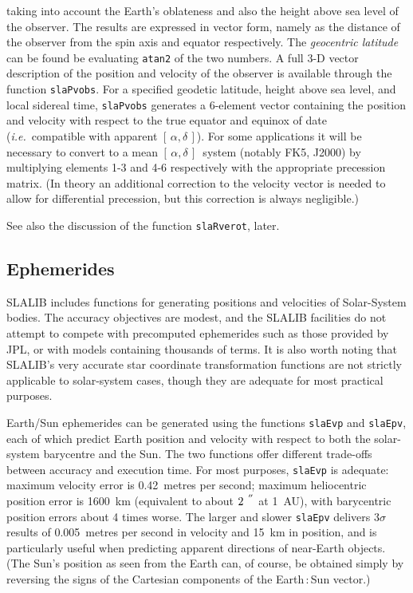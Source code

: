 \documentclass[11pt,fleqn,twoside]{article}
\renewcommand{\_}{{\tt\char'137}}     %
\newcommand{\radec}     {$[\,\alpha,\delta\,]$}
\newcommand{\arcseci}[1] {$#1\hspace{0.05em}$\raisebox{-0.5ex}
                         {$^{'\hspace{-0.1em}'\hspace{0.0em}}$}}
\begin{document}
taking into account the Earth's oblateness and also the height
above sea level of the observer.  The results are expressed in
vector form, namely as the distance of the observer from
the spin axis and equator respectively.  The {\it geocentric
latitude}\/ can be found be evaluating {\tt atan2} of the
two numbers.  A full 3-D vector description of the position
and velocity of the observer is available through the function
{\tt slaPvobs}.
For a specified geodetic latitude, height above
sea level, and local sidereal time,
{\tt slaPvobs}
generates a 6-element vector containing the position and
velocity with respect to the true equator and equinox of
date ({\it i.e.}~compatible with apparent \radec).  For
some applications it will be necessary to convert to a
mean \radec\ system (notably FK5, J2000) by multiplying
elements 1-3 and 4-6 respectively with the appropriate
precession matrix.  (In theory an additional correction to the
velocity vector is needed to allow for differential precession,
but this correction is always negligible.)
 
See also the discussion of the function
{\tt slaRverot},
later.

\label{ephem}
\subsection{Ephemerides}
SLALIB includes functions for generating positions and
velocities of Solar-System bodies.  The accuracy objectives are
modest, and the SLALIB facilities do not attempt
to compete with precomputed ephemerides such as
those provided by JPL, or with models containing
thousands of terms.  It is also worth noting
that SLALIB's very accurate star coordinate transformation
functions are not strictly applicable to solar-system cases,
though they are adequate for most practical purposes.
 
Earth/Sun ephemerides can be generated using the functions
{\tt slaEvp} and
{\tt slaEpv},
each of which predict Earth position and velocity with respect to both the
solar-system barycentre and the
Sun.  The two functions offer different trade-offs between
accuracy and execution time.  For most purposes,
{\tt slaEvp} is adequate:
maximum velocity error is 0.42~metres per second;  maximum
heliocentric position error is 1600~km (equivalent to
about \arcseci{2} at 1~AU),
with barycentric position errors about 4 times worse.
The larger and slower
{\tt slaEpv}
delivers $3\sigma$ results of 0.005~metres per second in velocity
and 15~km in position, and is particularly useful when predicting
apparent directions of near-Earth objects.
(The Sun's position as
seen from the Earth can, of course, be obtained simply by
reversing the signs of the Cartesian components of the
Earth\,:\,Sun vector.)
 
\end{document}
